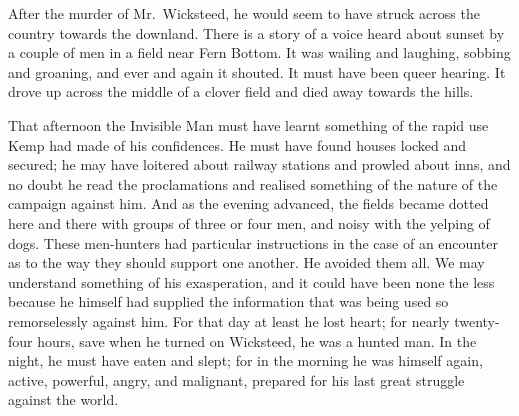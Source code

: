 After the murder of Mr.\ Wicksteed, he would seem to have struck across the country towards the downland. There is a story of a voice heard about sunset by a couple of men in a field near Fern Bottom. It was wailing and laughing, sobbing and groaning, and ever and again it shouted. It must have been queer hearing. It drove up across the middle of a clover field and died away towards the hills.

That afternoon the Invisible Man must have learnt something of the rapid use Kemp had made of his confidences. He must have found houses locked and secured; he may have loitered about railway stations and prowled about inns, and no doubt he read the proclamations and realised something of the nature of the campaign against him. And as the evening advanced, the fields became dotted here and there with groups of three or four men, and noisy with the yelping of dogs. These men-hunters had particular instructions in the case of an encounter as to the way they should support one another. He avoided them all. We may understand something of his exasperation, and it could have been none the less because he himself had supplied the information that was being used so remorselessly against him. For that day at least he lost heart; for nearly twenty-four hours, save when he turned on Wicksteed, he was a hunted man. In the night, he must have eaten and slept; for in the morning he was himself again, active, powerful, angry, and malignant, prepared for his last great struggle against the world.